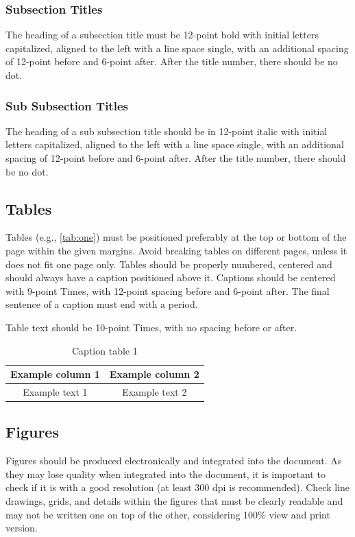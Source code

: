 \documentclass[english, spanish, brazilian]{RBIEarticle} %
\begin{document}
\subsubsection{Subsection Titles}
The heading of a subsection title must be 12-point bold with initial letters capitalized, aligned to the left with a line space single, with an additional spacing of 12-point before and 6-point after. After the title number, there should be no dot.


\subsubsection{Sub Subsection Titles}
The heading of a sub subsection title should be in 12-point italic with initial letters capitalized, aligned to the left with a line space single, with an additional spacing of 12-point before and 6-point after. After the title number, there should be no dot.


\subsection{Tables}
Tables (e.g., \autoref{tab:one}) must be positioned preferably at the top or bottom of the page within the given margins. Avoid breaking tables on different pages, unless it does not fit one page only. Tables should be properly numbered, centered and should always have a caption positioned above it. Captions should be centered with 9-point Times, with 12-point spacing before and 6-point after. The final sentence of a caption must end with a period.

Table text should be 10-point Times, with no spacing before or after.

\begin{table}[h]
	\caption{Caption table 1}
	\label{tab:one}
	\centering\footnotesize%
	\begin{tabular}{|c|c|}
		\hline
		\rowcolor{gray} \textbf{Example column 1} & \textbf{Example column 2}\\
		\hline
		Example text 1 & Example text 2\\
		\hline
	\end{tabular}
\end{table}


\subsection{Figures}
Figures should be produced electronically and integrated into the document. As they may lose quality when integrated into the document, it is important to check if it is with a good resolution (at least 300 dpi is recommended). Check line drawings, grids, and details within the figures that must be clearly readable and may not be written one on top of the other, considering 100\% view and print version.
\end{document}
